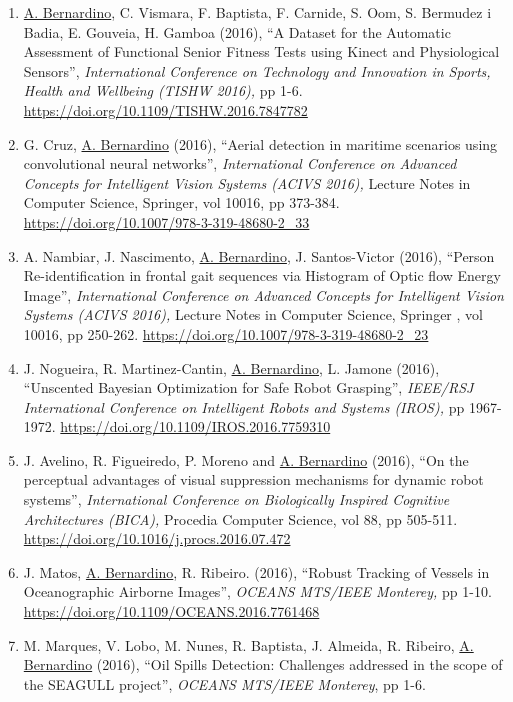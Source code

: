 \begin{enumerate}
\item
  \ul{A. Bernardino}, C. Vismara, F. Baptista, F. Carnide, S. Oom, S.
  Bermudez i Badia, E. Gouveia, H. Gamboa (2016), ``A Dataset for the
  Automatic Assessment of Functional Senior Fitness Tests using Kinect
  and Physiological Sensors'', \emph{International Conference on
  Technology and Innovation in Sports, Health and Wellbeing (TISHW
  2016),} pp 1-6. \url{https://doi.org/10.1109/TISHW.2016.7847782}~
\item
  G. Cruz, \ul{A. Bernardino} (2016), ``Aerial detection in maritime
  scenarios using convolutional neural networks'', \emph{International
  Conference on Advanced Concepts for Intelligent Vision Systems (ACIVS
  2016),} Lecture Notes in Computer Science, Springer, vol 10016, pp
  373-384. \url{https://doi.org/10.1007/978-3-319-48680-2_33}~
\item
  A. Nambiar, J. Nascimento, \ul{A. Bernardino}, J. Santos-Victor
  (2016), ``Person Re-identification in frontal gait sequences via
  Histogram of Optic flow Energy Image'', \emph{International Conference
  on Advanced Concepts for Intelligent Vision Systems (ACIVS 2016),}
  Lecture Notes in Computer Science, Springer , vol 10016, pp 250-262.
  \url{https://doi.org/10.1007/978-3-319-48680-2_23}~
\item
  J. Nogueira, R. Martinez-Cantin, \ul{A. Bernardino}, L. Jamone (2016),
  ``Unscented Bayesian Optimization for Safe Robot Grasping'',
  \emph{IEEE/RSJ International Conference on Intelligent Robots and
  Systems (IROS),} pp 1967-1972.
  \url{https://doi.org/10.1109/IROS.2016.7759310}~
\item
  J. Avelino, R. Figueiredo, P. Moreno and \ul{A. Bernardino} (2016),
  ``On the perceptual advantages of visual suppression mechanisms for
  dynamic robot systems'', \emph{International Conference on
  Biologically Inspired Cognitive Architectures (BICA),} Procedia
  Computer Science, vol 88, pp 505-511.
  \url{https://doi.org/10.1016/j.procs.2016.07.472}
\item
  J. Matos, \ul{A. Bernardino}, R. Ribeiro. (2016), ``Robust Tracking of
  Vessels in Oceanographic Airborne Images'',
  \emph{OCEANS MTS/IEEE Monterey,} pp 1-10.
  \url{https://doi.org/10.1109/OCEANS.2016.7761468}~
\item
  M. Marques, V. Lobo, M. Nunes, R. Baptista, J. Almeida, R. Ribeiro,
  \ul{A. Bernardino} (2016), ``Oil Spills Detection: Challenges
  addressed in the scope of the SEAGULL project'',
  \emph{OCEANS MTS/IEEE Monterey}, pp 1-6.

\end{enumerate}
